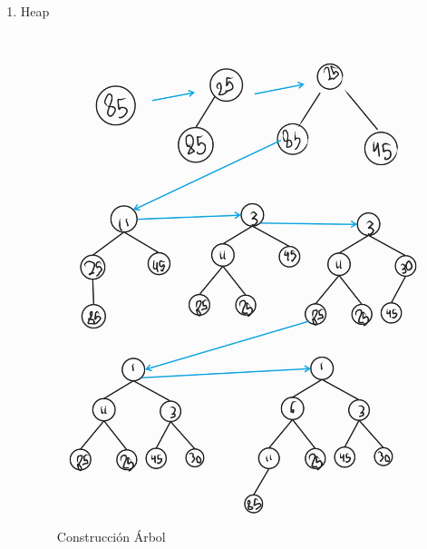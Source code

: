 \documentclass[letterpaper]{article}
\theoremstyle{definition}
\theoremstyle{lemathm}
\theoremstyle{lemademthm}
\begin{document}
\begin{enumerate}
\begin{enumerate}
\begin{lstlisting}
int main () {
	Vector3 v1(1 ,2 ,3) ;
	Vector3 v2(4 ,5 ,6) ;
	Vector3 *suma=sumaVectores (&v1,&v2) ;
	suma->imprime();
	delete suma;
	return 0;
}

			\end{lstlisting}

			\item Separar la definicion de la clase en una librería aparte y sobrecargar el operador +.
		\end{enumerate}
		
		\item Heap
		
		\begin{multicols}{2}

			\begin{figure}[H]
				\centering
				\includegraphics[scale = .1]{Images/Heap.jpg}
				\caption{Construcción Árbol}
			\end{figure}
			

\end{multicols}
\end{enumerate}
\end{document}
